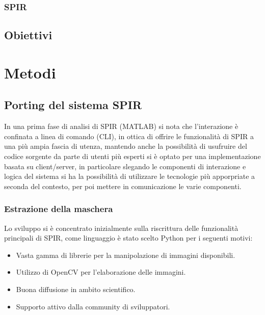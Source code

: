 \documentclass[a4paper,12pt]{report}
\begin{document}
    \subsection{SPIR}
  \section{Obiettivi}

\chapter{Metodi}
  \section{Porting del sistema SPIR}
    In una prima fase di analisi di SPIR (MATLAB) si nota che l'interazione è confinata
    a linea di comando (CLI), in ottica di offrire le funzionalità di SPIR a una più ampia
    fascia di utenza, mantendo anche la possibilità di usufruire del codice sorgente 
    da parte di utenti più esperti si è optato per una implementazione basata su client/server,
    in particolare slegando le componenti di interazione e logica del sistema si ha la possibilità
    di utilizzare le tecnologie più apporpriate a seconda del contesto, per poi mettere in comunicazione le 
    varie componenti.
    \subsection{Estrazione della maschera}
      Lo sviluppo si è concentrato inizialmente sulla riscrittura delle funzionalità principali di SPIR,
      come linguaggio è stato scelto Python per i seguenti motivi:
      \begin{itemize}
        \item Vasta gamma di librerie per la manipolazione di immagini disponibili.
        \item Utilizzo di OpenCV per l'elaborazione delle immagini.
        \item Buona diffusione in ambito scientifico.
        \item Supporto attivo dalla community di sviluppatori.
      \end{itemize}
\end{document}
